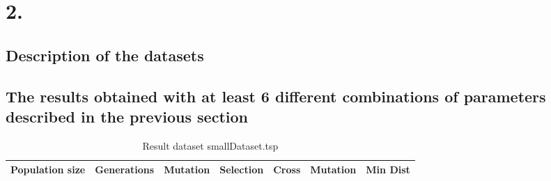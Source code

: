 \documentclass[12pt]{report}
\begin{document}
    \section{2.}

    \subsection{Description of the datasets}
    \subsection{The results obtained with at least 6 different combinations of parameters
    described in the previous section}

    \begin{table}
        \centering
        \begin{tabular}{|c|c|c|c|c|c|c|}
            \hline
            Population size & Generations & Mutation & Selection & Cross & Mutation & Min Dist\\
            \hline
        \end{tabular}
        \caption{Result dataset smallDataset.tsp}
        \label{results}

    \end{table}

     
	 


    
\end{document}
